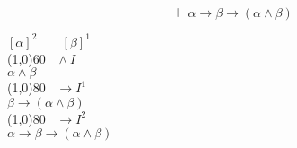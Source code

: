 \documentclass{article}
\theoremstyle{break}
\theoremstyle{break}
\theoremstyle{break}
\theoremstyle{break}
\begin{document}
\begin{exercise}
    \[
    \vdash \alpha \to \beta \to (\alpha \wedge \beta)
    \] 
    \begin{center}
        \( [\alpha]^2\;\;\;\;\;\;\; [\beta]^1 \) \\
                    \hspace{0.6cm}\line(1,0){60}\(\;\;\; \wedge I \)\\
        \( \alpha \wedge \beta \) \\
                    \hspace{1cm}\line(1,0){80}\(\;\;\; \to I^1 \)\\
         \( \beta \to (\alpha \wedge \beta) \) \\
                     \hspace{1cm}\line(1,0){80}\(\;\;\; \to I^2 \)\\
         \( \alpha \to  \beta \to  (\alpha \wedge \beta) \) 
    \end{center}
\end{exercise}
\end{document}
